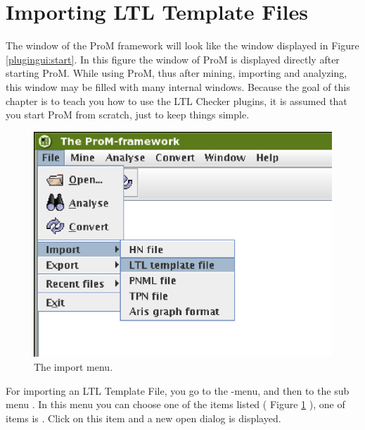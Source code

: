 \section{Importing LTL Template Files}
\label{plugingui:importing}

The window of the ProM framework will look like the window displayed in Figure
\ref{plugingui:start}. In this figure the window of ProM is displayed directly
after starting ProM. While using ProM, thus after mining,
importing and analyzing, this window may be filled with many internal windows.
Because the goal of this chapter is to teach you how
to use the LTL Checker plugins, it is assumed that you start ProM from scratch, just to
keep things simple.

\begin{figure}[H]
    \includegraphics[scale=0.5]{images/framework-import-menu-cutted.eps}
    \caption{The import menu.}
    \label{plugingui:importmenu}
\end{figure}

For importing an LTL Template File, you go to the -menu, and then to
the sub menu . In this menu you can choose one of the items
listed ( Figure \ref{plugingui:importmenu} ), one of items is . Click on
this item and a new open dialog is displayed.

